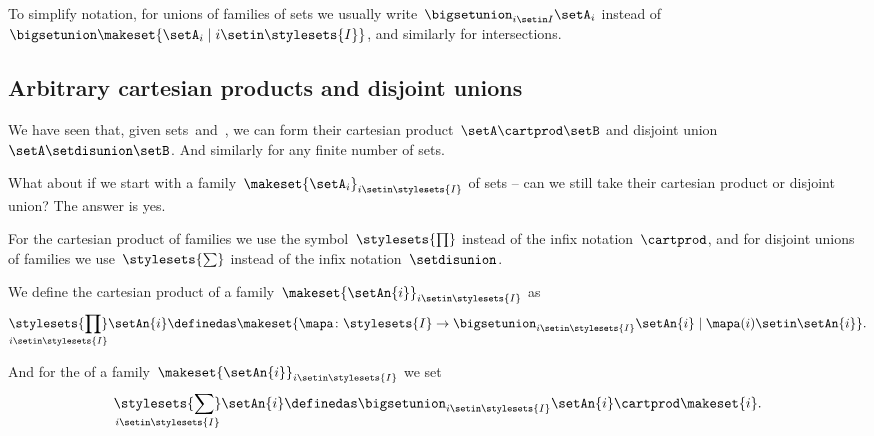 \begin{remark}
    To simplify notation, for unions of families of sets we usually write~$\bigsetunion_{i \setin I} \setA_i $ instead of~$\bigsetunion \makeset{  \setA_i \mid i \setin\stylesets{I} }$, and similarly for intersections.
\end{remark}

\subsection{Arbitrary cartesian products and disjoint unions}

We have seen that, given sets~\setA and~\setB, we can form their cartesian product~$\setA \cartprod \setB$ and disjoint union~$\setA \setdisunion \setB$.
And similarly for any finite number of sets.

What about if we start with a family~$\makeset{ \setA_i }_{i \setin\stylesets{I}}$ of sets -- can we still take their cartesian product or disjoint union?
The answer is yes.

For the cartesian product of families we use the symbol~$\stylesets{\prod}$ instead of the infix notation~$\cartprod$, and for disjoint unions of families we use~$\stylesets{\sum}$ instead of the infix notation~$\setdisunion$.

We define the cartesian product of a family~$\makeset{ \setAn{i} }_{i \setin\stylesets{I}}$ as
\begin{equation}
    \underset{i \setin\stylesets{I}}{\stylesets{\prod}}  \setAn{i}  \definedas \makeset{ \mapa \colon \stylesets{I} \to \bigsetunion_{i \setin\stylesets{I} } \setAn{i} \mid \mapa(i) \setin\setAn{i} }.
\end{equation}

And for the  of a family~$\makeset{ \setAn{i} }_{i \setin\stylesets{I}}$ we set
\begin{equation}
    \underset{i \setin\stylesets{I}}{\stylesets{\sum}} \setAn{i} \definedas \bigsetunion_{i \setin\stylesets{I}} \setAn{i} \cartprod \makeset{ i }.
\end{equation}

